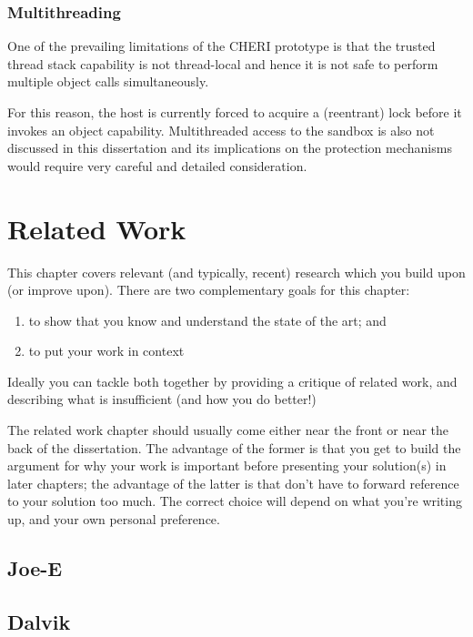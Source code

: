 \documentclass[a4paper,12pt,twoside,openright]{report}
\begin{document}
\subsection{Multithreading}

One of the prevailing limitations of the CHERI prototype is that the trusted thread stack capability is not thread-local and hence it is not safe to perform multiple object calls simultaneously. 

For this reason, the host is currently forced to acquire a (reentrant) lock before it invokes an object capability. Multithreaded access to the sandbox is also not discussed in this dissertation and its implications on the protection mechanisms would require very careful and detailed consideration.

\chapter{Related Work} 

This chapter covers relevant (and typically, recent) research 
which you build upon (or improve upon). There are two complementary 
goals for this chapter: 
\begin{enumerate} 
  \item to show that you know and understand the state of the art; and 
  \item to put your work in context
\end{enumerate} 

Ideally you can tackle both together by providing a critique of
related work, and describing what is insufficient (and how you do
better!)

The related work chapter should usually come either near the front or
near the back of the dissertation. The advantage of the former is that
you get to build the argument for why your work is important before
presenting your solution(s) in later chapters; the advantage of the
latter is that don't have to forward reference to your solution too
much. The correct choice will depend on what you're writing up, and
your own personal preference.

\section{Joe-E}

\section{Dalvik}
\end{document}
